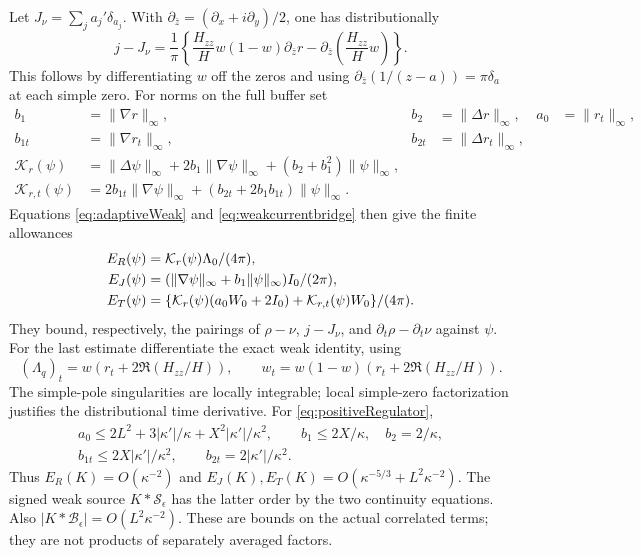 Let $J_\nu=\sum_j a_j'\delta_{a_j}$. With
$\partial_{\bar z}=(\partial_x+i\partial_y)/2$, one has distributionally
\begin{equation}
 j-J_\nu=\frac1\pi\left\{\frac{H_{zz}}H w(1-w)\partial_{\bar z}r
             -\partial_{\bar z}\left(\frac{H_{zz}}H w\right)\right\}.
 \label{eq:weakcurrentbridge}
\end{equation}
This follows by differentiating $w$ off the zeros and using
$\partial_{\bar z}(1/(z-a))=\pi\delta_a$ at each simple zero.
For norms on the full buffer set
\begin{align*}
 b_1&=\|\nabla r\|_\infty,&b_2&=\|\Delta r\|_\infty,&a_0&=\|r_t\|_\infty,\\
 b_{1t}&=\|\nabla r_t\|_\infty,&b_{2t}&=\|\Delta r_t\|_\infty,\\
 \mathcal K_r(\psi)&=\|\Delta\psi\|_\infty+2b_1\|\nabla\psi\|_\infty
                     +(b_2+b_1^2)\|\psi\|_\infty,\\
 \mathcal K_{r,t}(\psi)&=2b_{1t}\|\nabla\psi\|_\infty
                     +(b_{2t}+2b_1b_{1t})\|\psi\|_\infty.
\end{align*}
Equations \eqref{eq:adaptiveWeak} and \eqref{eq:weakcurrentbridge}
then give the finite allowances
\begin{align}
 E_R(\psi)&=\mathcal K_r(\psi)\Lambda_0/(4\pi),\notag\\
 E_J(\psi)&=(\|\nabla\psi\|_\infty+b_1\|\psi\|_\infty)I_0/(2\pi),\notag\\
 E_T(\psi)&=\{\mathcal K_r(\psi)(a_0W_0+2I_0)
                          +\mathcal K_{r,t}(\psi)W_0\}/(4\pi).
 \label{eq:transportallowances}
\end{align}
They bound, respectively, the pairings of $\rho-\nu$,
$j-J_\nu$, and $\partial_t\rho-\partial_t\nu$ against $\psi$.
For the last estimate differentiate the exact weak identity, using
\[
 (\Lambda_q)_t=w(r_t+2\Re(H_{zz}/H)),\qquad
 w_t=w(1-w)(r_t+2\Re(H_{zz}/H)).
\]
The simple-pole singularities are locally integrable; local simple-zero
factorization justifies the distributional time derivative.
For \eqref{eq:positiveRegulator},
\begin{gather*}
 a_0\le2L^2+3|\kappa'|/\kappa+X^2|\kappa'|/\kappa^2,\qquad
 b_1\le2X/\kappa,\quad b_2=2/\kappa,\\
 b_{1t}\le2X|\kappa'|/\kappa^2,\qquad b_{2t}=2|\kappa'|/\kappa^2.
\end{gather*}
Thus $E_R(K)=O(\kappa^{-2})$ and
$E_J(K),E_T(K)=O(\kappa^{-5/3}+L^2\kappa^{-2})$.
The signed weak source $K*\mathcal S_\epsilon$ has the latter order
by the two continuity equations. Also
$|K*\mathcal B_\epsilon|=O(L^2\kappa^{-2})$.
These are bounds on the actual correlated terms; they are not products
of separately averaged factors.

